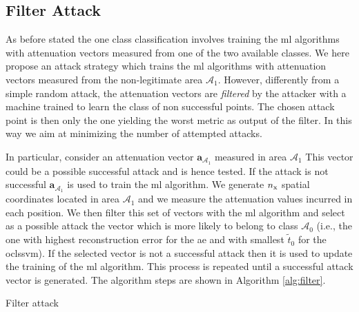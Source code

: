 \documentclass[draftcls,onecolumn,12pt]{IEEEtran}
\begin{document}
\subsection{Filter Attack}
As before stated the one class classification involves training the \ac{ml} algorithms with attenuation vectors measured from one of the two available classes. We here propose an attack strategy which trains the \ac{ml} algorithms with attenuation vectors measured from the non-legitimate area $\mathcal{A}_1$. However, differently from a simple random attack, the attenuation vectors are \emph{filtered} by the attacker with a machine trained to learn the class of non successful points. The chosen attack point is then only the one yielding the worst metric as output of the filter. In this way we aim at minimizing the number of attempted attacks.

In particular, consider an attenuation vector $\bm{a}_{\mathcal{A}_1}$ measured in area $\mathcal{A}_1$ This vector could be a possible successful attack and is hence tested. If the attack is not successful $\bm{a}_{\mathcal{A}_1}$ is used to train the \ac{ml} algorithm. 
We generate $n_{\rm x}$ spatial coordinates located in area $\mathcal{A}_1$ and we measure the attenuation values incurred in each position. We then filter this set of vectors with the \ac{ml} algorithm and select as a possible attack the vector which is more likely to belong to class $\mathcal{A}_0$ (i.e., the one with highest reconstruction error for the \ac{ae} and with smallest $\tilde{t}_0$ for the \ac{oclssvm}). If the selected vector is not a successful attack then it is used to update the training of the \ac{ml} algorithm. This process is repeated until a successful attack vector is generated. The algorithm steps are shown in Algorithm \ref{alg:filter}.

\begin{algorithm}[t]
\label{alg:filter}
  \scriptsize

 

    
 \caption{Filter attack}
\end{algorithm}
\end{document}
